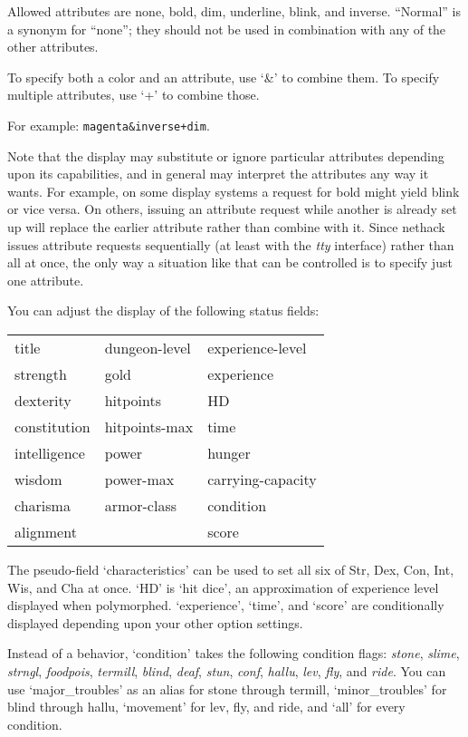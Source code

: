 Allowed attributes are none, bold, dim, underline, blink, and inverse.
``Normal'' is a synonym for ``none''; they should not be used in
combination with any of the other attributes.

To specify both a color and an attribute, use `\&' to combine them.
To specify multiple attributes, use `+' to combine those.

For example: {\tt magenta\&inverse+dim}.

Note that the display may substitute or ignore particular attributes
depending upon its capabilities, and in general may interpret the
attributes any way it wants.
For example, on some display systems a request for bold might yield
blink or vice versa.
On others, issuing an attribute request while another is already
set up will replace the earlier attribute rather than combine with it.
Since nethack issues attribute requests sequentially (at least with
the {\it tty} interface) rather than all at once, the only way a
situation like that can be controlled is to specify just one attribute.

You can adjust the display of the following status fields:
\begin{center}
\begin{tabular}{lll}
title & dungeon-level & experience-level\\
strength & gold & experience\\
dexterity & hitpoints & HD\\
constitution & hitpoints-max & time\\
intelligence & power & hunger\\
wisdom & power-max & carrying-capacity\\
charisma & armor-class & condition\\
alignment &  & score\\
\end{tabular}
\end{center}
The pseudo-field `characteristics' can be used to set all six
of Str, Dex, Con, Int, Wis, and Cha at once.  `HD' is `hit dice',
an approximation of experience level displayed when polymorphed.
`experience', `time', and `score' are conditionally displayed
depending upon your other option settings.

Instead of a behavior, `condition' takes the following condition flags:
{\it stone}, {\it slime}, {\it strngl}, {\it foodpois}, {\it termill},
{\it blind}, {\it deaf}, {\it stun}, {\it conf}, {\it hallu},
{\it lev}, {\it fly}, and {\it ride}.
You can use `major\_troubles' as an alias
for stone through termill, `minor\_troubles' for blind through hallu,
`movement' for lev, fly, and ride, and `all' for every condition.

